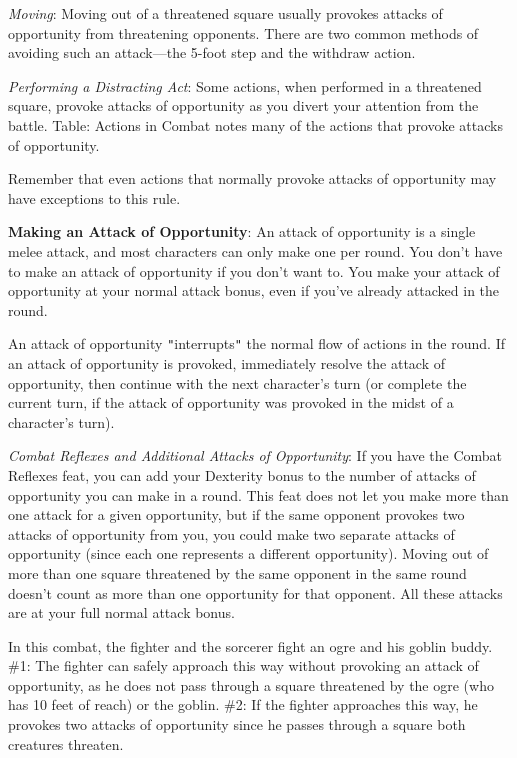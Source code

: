 \textit{Moving}: Moving out of a threatened square usually provokes attacks of opportunity from threatening opponents. There are two common methods of avoiding such an attack---the 5-foot step and the withdraw action.
				
\textit{Performing a Distracting Act}: Some actions, when performed in a threatened square, provoke attacks of opportunity as you divert your attention from the battle. Table: Actions in Combat notes many of the actions that provoke attacks of opportunity.
				
Remember that even actions that normally provoke attacks of opportunity may have exceptions to this rule.
				
\textbf{Making an Attack of Opportunity}: An attack of opportunity is a single melee attack, and most characters can only make one per round. You don't have to make an attack of opportunity if you don't want to. You make your attack of opportunity at your normal attack bonus, even if you've already attacked in the round.
				
An attack of opportunity \texttt{{}"{}}interrupts\texttt{{}"{}} the normal flow of actions in the round. If an attack of opportunity is provoked, immediately resolve the attack of opportunity, then continue with the next character's turn (or complete the current turn, if the attack of opportunity was provoked in the midst of a character's turn).
				
\textit{Combat Reflexes and Additional Attacks of Opportunity}: If you have the Combat Reflexes feat, you can add your Dexterity bonus to the number of attacks of opportunity you can make in a round. This feat does not let you make more than one attack for a given opportunity, but if the same opponent provokes two attacks of opportunity from you, you could make two separate attacks of opportunity (since each one represents a different opportunity). Moving out of more than one square threatened by the same opponent in the same round doesn't count as more than one opportunity for that opponent. All these attacks are at your full normal attack bonus.

In this combat, the fighter and the sorcerer fight an ogre and his goblin buddy.\newline
\#1: The fighter can safely approach this way without provoking an attack of opportunity, as he does not pass through a square threatened by the ogre (who has 10 feet of reach) or the goblin.\newline
\#2: If the fighter approaches this way, he provokes two attacks of opportunity since he passes through a square both creatures threaten.

